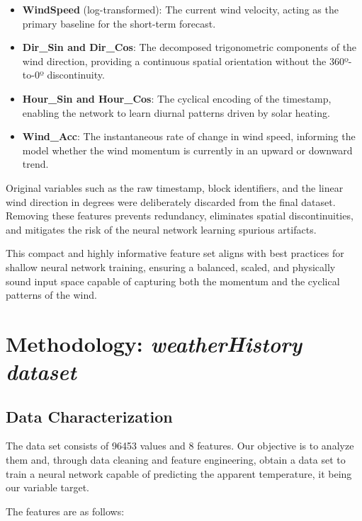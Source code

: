 \documentclass[conference]{IEEEtran}
\begin{document}
\begin{itemize}
    \item \textbf{WindSpeed} (log-transformed): The current wind velocity, acting as the primary baseline for the short-term forecast.
    \item \textbf{Dir\_Sin and Dir\_Cos}: The decomposed trigonometric components of the wind direction, providing a continuous spatial orientation without the 360º-to-0º discontinuity.
    \item \textbf{Hour\_Sin and Hour\_Cos}: The cyclical encoding of the timestamp, enabling the network to learn diurnal patterns driven by solar heating.
    \item \textbf{Wind\_Acc}: The instantaneous rate of change in wind speed, informing the model whether the wind momentum is currently in an upward or downward trend.
\end{itemize}

Original variables such as the raw timestamp, block identifiers, and the linear wind direction in degrees were deliberately discarded from the final dataset. Removing these features prevents redundancy, eliminates spatial discontinuities, and mitigates the risk of the neural network learning spurious artifacts. 

This compact and highly informative feature set aligns with best practices for shallow neural network training, ensuring a balanced, scaled, and physically sound input space capable of capturing both the momentum and the cyclical patterns of the wind.


\section{Methodology: \textit{weatherHistory dataset}}

\subsection{Data Characterization}

The data set consists of 96453 values and 8 features. Our objective is to analyze them and, through data cleaning and feature engineering, obtain a data set to train a neural network capable of predicting the apparent temperature, it being our variable target.

The features are as follows:
\end{document}

